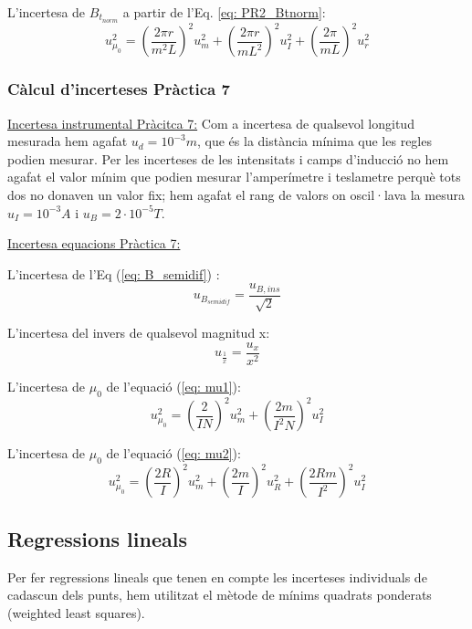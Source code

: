 \documentclass[11pt]{article}
\numberwithin{equation}{section}
\numberwithin{figure}{section}
\numberwithin{table}{section}
\begin{document}
L'incertesa de $B_{t_{norm}}$ a partir de l'Eq. \eqref{eq: PR2_Btnorm}:
\begin{equation}
    u_{\mu_0}^2 = \left(\frac{2\pi r}{m^2L}\right)^2u_m^2 + \left(\frac{2\pi r}{mL^2}\right)^2u_I^2 + \left(\frac{2\pi}{mL}\right)^2u_r^2
\end{equation}

\subsubsection{Càlcul d'incerteses Pràctica 7}\label{sec: incerteses}


\underline{Incertesa instrumental Pràcitca 7:}
Com a incertesa de qualsevol longitud mesurada hem agafat $u_d = 10^{-3}m$, que és la distància mínima que les regles podien mesurar.
Per les incerteses de les intensitats i camps d'inducció no hem agafat el valor mínim que podien mesurar l'amperímetre i teslametre perquè tots dos no donaven un valor fix; hem agafat el rang de valors on oscil·lava la mesura $u_I = 10^{-3}A$ i $u_B = 2 \cdot 10^{-5}T$.

\underline{Incertesa equacions Pràctica 7:}

L'incertesa de l'Eq (\ref{eq: B_semidif}) :
\begin{equation}
    u_{B_{semidif}} = \frac{u_{B,ins}}{\sqrt{2}}
\end{equation}

L'incertesa del invers de qualsevol magnitud x:
\begin{equation}
    u_{\frac{1}{x}} = \frac{u_x}{x^2}
\end{equation}

L'incertesa de $\mu_0$ de l'equació (\ref{eq: mu1}):
\begin{equation}
    u_{\mu_0}^2 = \left(\frac{2}{IN}\right)^2u_m^2 + \left(\frac{2m}{I^2N}\right)^2u_I^2
\end{equation}

L'incertesa de $\mu_0$ de l'equació (\ref{eq: mu2}):
\begin{equation}
    u_{\mu_0}^2 = \left(\frac{2R}{I}\right)^2u_m^2 + \left(\frac{2m}{I}\right)^2u_R^2 + \left(\frac{2Rm}{I^2}\right)^2u_I^2
\end{equation}

\subsection{Regressions lineals} \label{sec: Ap_Regr}
Per fer regressions lineals que tenen en compte les incerteses individuals de cadascun dels punts, hem utilitzat el mètode de mínims quadrats ponderats (weighted least squares).
 
\end{document}
